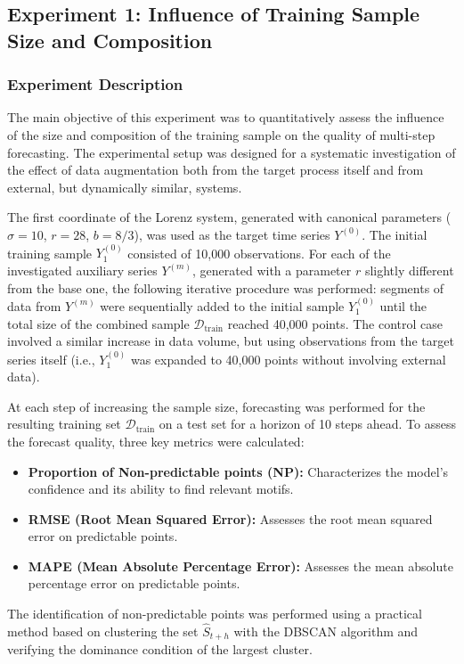 \documentclass[a4paper,12pt]{extarticle}
\begin{document}
\subsection{Experiment 1: Influence of Training Sample Size and Composition}
\subsubsection{Experiment Description}
The main objective of this experiment was to quantitatively assess the influence of the size and
composition of the training sample on the quality of multi-step forecasting. The experimental
 setup was designed for a systematic investigation of the effect of data augmentation
 both from the target process itself and from external, but dynamically similar, systems.

The first coordinate of the Lorenz system, generated with canonical parameters ($\sigma = 10$, $r = 28$, $b = 8/3$), was used as the target time series $Y^{(0)}$.
 The initial training sample $Y_1^{(0)}$ consisted of 10,000 observations. For each of the investigated
  auxiliary series $Y^{(m)}$, generated with a parameter $r$ slightly different from
   the base one, the following iterative procedure was performed: segments of data from $Y^{(m)}$ were
   sequentially added to the initial sample $Y_1^{(0)}$ until the total size of the
   combined sample $\mathcal{D}_{\text{train}}$ reached 40,000 points. The control
   case involved a similar increase in data volume, but using observations
    from the target series itself (i.e., $Y_1^{(0)}$ was expanded to 40,000 points without involving external data).

At each step of increasing the sample size, forecasting was performed for the resulting training
 set $\mathcal{D}_{\text{train}}$ on a test set for a horizon of 10 steps ahead. To assess the forecast quality, three key metrics were calculated:
\begin{itemize}
    \item \textbf{Proportion of Non-predictable points (NP):} Characterizes
    the model's confidence and its ability to find relevant motifs.
    \item \textbf{RMSE (Root Mean Squared Error):} Assesses the root mean squared error on predictable points.
    \item \textbf{MAPE (Mean Absolute Percentage Error):} Assesses
    the mean absolute percentage error on predictable points.
\end{itemize}
The identification of non-predictable points was performed using a practical
 method based on clustering the set $\hat{S}_{t+h}$ with the DBSCAN algorithm
 and verifying the dominance condition of the largest cluster.
\end{document}
